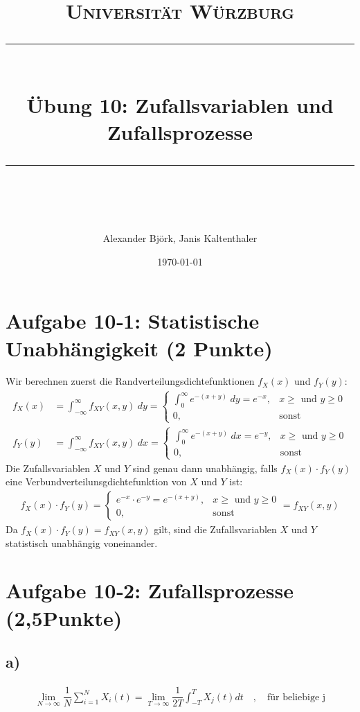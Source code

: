 \documentclass[11pt]{scrartcl} %
\title{	
	\normalfont\normalsize
	\textsc{Universität Würzburg}\\ %
	\vspace{25pt} %
	\rule{\linewidth}{0.5pt}\\ %
	\vspace{20pt} %
	{\huge Übung 10: Zufallsvariablen und Zufallsprozesse}\\ %
	\vspace{12pt} %
	\rule{\linewidth}{2pt}\\ %
	\vspace{12pt} %
}
\author{\LARGE Alexander Björk, Janis Kaltenthaler} %
\date{\normalsize\today} %
\begin{document}
\maketitle %


\section*{Aufgabe 10‐1: Statistische Unabhängigkeit (2 Punkte)} 
Wir berechnen zuerst die Randverteilungsdichtefunktionen $f_X(x)$ und $f_Y(y)$:
\begin{align*}
	f_X(x)&=\int_{-\infty}^{\infty}f_{XY}(x,y)\hspace{3pt}dy=\begin{cases}\int_{0}^{\infty}e^{-(x+y)}\hspace{3pt}dy=e^{-x}, & x\ge\text{ und }y \ge0 \\0, & \text{sonst} \end{cases}\\
	f_Y(y)&=\int_{-\infty}^{\infty}f_{XY}(x,y)\hspace{3pt}dx=\begin{cases}\int_{0}^{\infty}e^{-(x+y)}\hspace{3pt}dx=e^{-y}, & x\ge\text{ und }y \ge0 \\0, & \text{sonst} \end{cases}
\end{align*}
Die Zufallsvariablen $X$ und $Y$ sind genau dann unabhängig, falls $f_X(x)\cdot f_Y(y)$ eine Verbundverteilunsgdichtefunktion von $X$ und $Y$ ist:
\begin{align*}
	f_X(x)\cdot f_Y(y)=\begin{cases}e^{-x}\cdot e^{-y}=e^{-(x+y)}, & x\ge\text{ und }y \ge0 \\0, & \text{sonst} \end{cases}=f_{XY}(x,y)
\end{align*}
Da $f_X(x)\cdot f_Y(y)=f_{XY}(x,y)$ gilt, sind die Zufallsvariablen $X$ und $Y$ statistisch unabhängig voneinander.


\section*{Aufgabe 10‐2: Zufallsprozesse (2,5Punkte)}
\subsection*{a)}
\begin{align*}
\lim_{N \rightarrow \infty} \dfrac{1}{N} \sum_{i=1}^N X_i\left(t\right) = \lim_{T \rightarrow \infty} \dfrac{1}{2T} \int_{-T}^T X_j\left(t\right)dt \quad , \quad \text{für beliebige j}
\end{align*}
\end{document}
